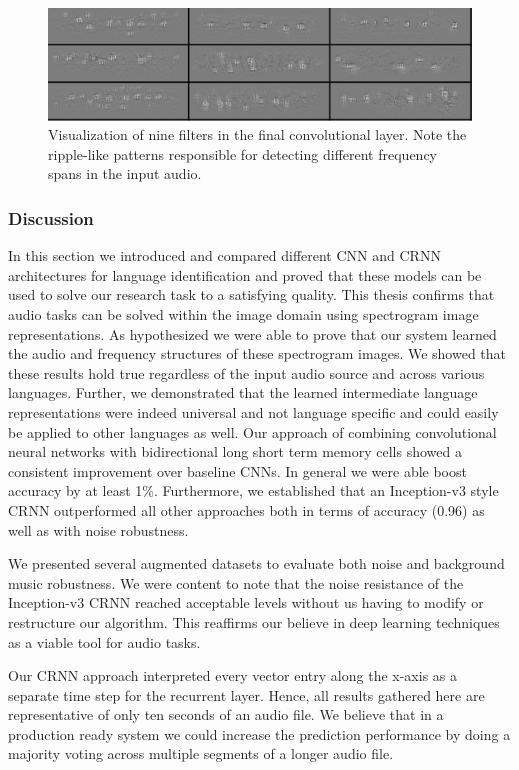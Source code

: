 	\begin{figure}[h]
  		\centering
    	\includegraphics[width=\textwidth, keepaspectratio]{img/conv_filter.png}
    	\caption{Visualization of nine filters in the final convolutional layer. Note the ripple-like patterns responsible for detecting different frequency spans in the input audio.}
    	\label{fig:conv_filter}
	\end{figure}

\subsubsection{Discussion} 
\label{sec:comparison}
In this section we introduced and compared different CNN and CRNN architectures for language identification and proved that these models can be used to solve our research task to a satisfying quality. This thesis confirms that audio tasks can be solved within the image domain using spectrogram image representations. As hypothesized we were able to prove that our system learned the audio and frequency structures of these spectrogram images. We showed that these results hold true regardless of the input audio source and across various languages. Further, we  demonstrated that the learned intermediate language representations were indeed universal and not language specific and could easily be applied to other languages as well.
 Our approach of combining convolutional neural networks with bidirectional long short term memory cells showed a consistent improvement over baseline CNNs. In general we were able boost accuracy by at least 1\%. Furthermore, we established that an Inception-v3 style CRNN outperformed all other approaches both in terms of accuracy (0.96) as well as with noise robustness. 

We presented several augmented datasets to evaluate both noise and background music robustness. We were content to note that the noise resistance of the Inception-v3 CRNN reached acceptable levels without us having to modify or restructure our algorithm. This reaffirms our believe in deep learning techniques as a viable tool for audio tasks.

Our CRNN approach interpreted every vector entry along the x-axis as a separate time step for the recurrent layer. Hence, all results gathered here are representative of only ten seconds of an audio file. We believe that in a production ready system we could increase the prediction performance by doing a majority voting across multiple segments of a longer audio file. 


